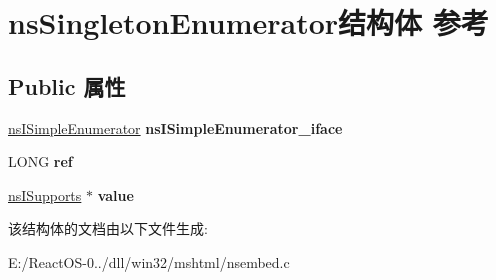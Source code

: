 \hypertarget{structns_singleton_enumerator}{}\section{ns\+Singleton\+Enumerator结构体 参考}
\label{structns_singleton_enumerator}
\subsection*{Public 属性}
\begin{DoxyCompactItemize}
\item 
\mbox{\label{structns_singleton_enumerator_a3e9743853c180906f9cee219a2b961f0}} 
\hyperlink{interfacens_i_simple_enumerator}{ns\+I\+Simple\+Enumerator} {\bfseries ns\+I\+Simple\+Enumerator\+\_\+iface}
\item 
\mbox{\label{structns_singleton_enumerator_a25fb9abf9be43a5af1c6576c7b3b02ce}} 
L\+O\+NG {\bfseries ref}
\item 
\mbox{\label{structns_singleton_enumerator_a7fdad098d57f8bacebb4dcf122990999}} 
\hyperlink{interfacens_i_supports}{ns\+I\+Supports} $\ast$ {\bfseries value}
\end{DoxyCompactItemize}


该结构体的文档由以下文件生成\+:\begin{DoxyCompactItemize}
\item 
E\+:/\+React\+O\+S-\/0../dll/win32/mshtml/nsembed.\+c\end{DoxyCompactItemize}
